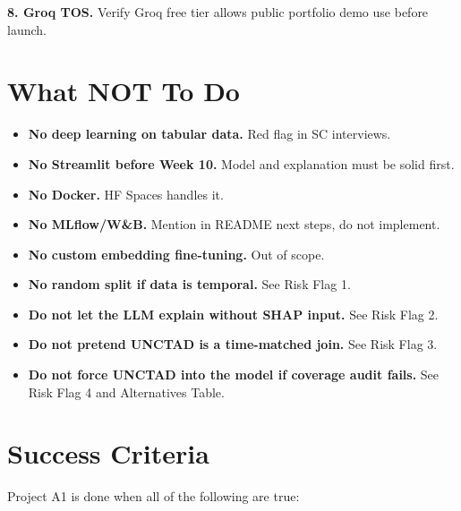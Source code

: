 \documentclass[11pt, a4paper]{article}
\begin{document}
\begin{warnbox}
\textbf{8. Groq TOS.} Verify Groq free tier allows public portfolio demo use before launch.
\end{warnbox}

\section{What NOT To Do}

\begin{itemize}[noitemsep]
  \item \textbf{No deep learning on tabular data.} Red flag in SC interviews.
  \item \textbf{No Streamlit before Week 10.} Model and explanation must be solid first.
  \item \textbf{No Docker.} HF Spaces handles it.
  \item \textbf{No MLflow/W\&B.} Mention in README next steps, do not implement.
  \item \textbf{No custom embedding fine-tuning.} Out of scope.
  \item \textbf{No random split if data is temporal.} See Risk Flag 1.
  \item \textbf{Do not let the LLM explain without SHAP input.} See Risk Flag 2.
  \item \textbf{Do not pretend UNCTAD is a time-matched join.} See Risk Flag 3.
  \item \textbf{Do not force UNCTAD into the model if coverage audit fails.} See Risk Flag 4 and Alternatives Table.
\end{itemize}

\section{Success Criteria}

Project A1 is done when all of the following are true:
\end{document}
